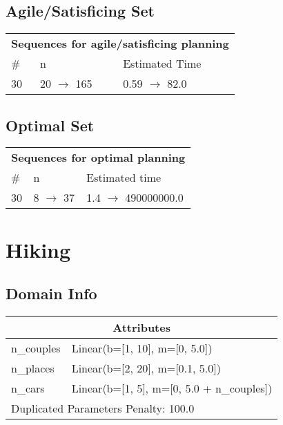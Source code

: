 \documentclass{article}
\begin{document}
                         \subsection*{Agile/Satisficing Set}

                        \begin{center}
                        \begin{tabular}{l|l|l}
                        \multicolumn{3}{c}{\bf \large Sequences for agile/satisficing planning}\\
                        \# & n & Estimated Time\\\midrule
                        30&20 $\rightarrow$ 165&0.59 $\rightarrow$ 82.0
                        \end{tabular}
                        \end{center}
                    
                            \subsection*{Optimal Set}

                            \begin{center}
                            \begin{tabular}{l|l|l}
                            \multicolumn{3}{c}{\bf \large Sequences for optimal planning}\\
                            \# & n & Estimated time\\\midrule
                            30&8 $\rightarrow$ 37&1.4 $\rightarrow$ 490000000.0
                            \end{tabular}
                            \end{center}
                    \newpage \section{Hiking}
                    \subsection*{Domain Info}

                    \begin{center}
                    \begin{tabular}{p{}p{}}
                    \multicolumn{2}{c}{\bf \large Attributes}\\\midrule
                    n\_couples & Linear(b=[1, 10], m=[0, 5.0])\\
n\_places & Linear(b=[2, 20], m=[0.1, 5.0])\\
n\_cars & Linear(b=[1, 5], m=[0, 5.0 + n\_couples])
                    
                     \\\midrule
                    \multicolumn{2}{l}{Duplicated Parameters Penalty: 100.0}
                    \end{tabular}
                    \end{center}
                
\end{document}
